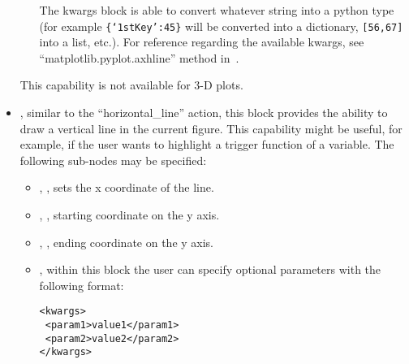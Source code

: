 \begin{itemize}
\begin{itemize}
  The kwargs block is able to convert whatever string into a python type (for
  example \texttt{\{`1stKey':45\}} will
  be converted into a dictionary, 
  \texttt{[56,67]} into a list, etc.).
    For reference regarding the available kwargs, see
    ``matplotlib.pyplot.axhline'' method in~\cite{MatPlotLib}.
  \end{itemize}
  \nb This capability is not available for 3-D plots.
  \item {}, similar to the ``horizontal\_line'' action,
  this block provides the ability to draw a vertical line in the current figure.
  This capability might be useful, for example, if the user wants to highlight a
  trigger function of a variable.
  The following sub-nodes may be specified:
  \begin{itemize}
    \item {}, , sets the x coordinate of the
    line.
    \item {}, , starting coordinate on
    the y axis.
    \item {}, , ending coordinate on the
    y axis.
    \item {}, within this block the user can specify optional
    parameters with the following format:

\begin{lstlisting}[style=XML]
<kwargs>
 <param1>value1</param1>
 <param2>value2</param2>
</kwargs>
\end{lstlisting}


\end{itemize}
\end{itemize}
